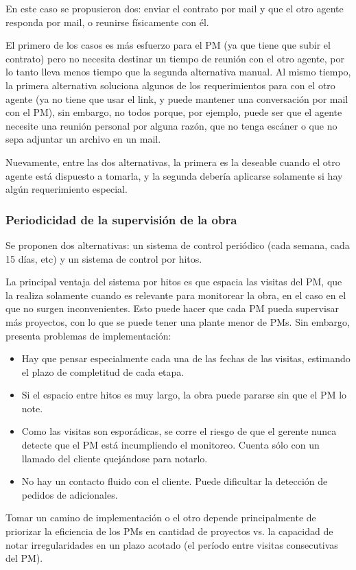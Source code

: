 En este caso se propusieron dos: enviar el contrato por mail y que el otro agente responda por mail, o reunirse físicamente con él.

El primero de los casos es más esfuerzo para el PM (ya que tiene que subir el contrato) pero no necesita destinar un tiempo de reunión con el otro agente, por lo tanto lleva menos tiempo que la segunda alternativa manual.
Al mismo tiempo, la primera alternativa soluciona algunos de los requerimientos para con el otro agente (ya no tiene que usar el link, y puede mantener una conversación por mail con el PM), sin embargo, no todos porque, por ejemplo, puede ser que el agente necesite una reunión personal por alguna razón, que no tenga escáner o que no sepa adjuntar un archivo en un mail.

Nuevamente, entre las dos alternativas, la primera es la deseable cuando el otro agente está dispuesto a tomarla, y la segunda debería aplicarse solamente si hay algún requerimiento especial.

\subsubsection{Periodicidad de la supervisión de la obra}
Se proponen dos alternativas: un sistema de control periódico (cada semana, cada 15 días, etc) y un sistema de control por hitos.

La principal ventaja del sistema por hitos es que espacia las visitas del PM, que la realiza solamente cuando es relevante para monitorear la obra, en el caso en el que no surgen inconvenientes. Esto puede hacer que cada PM pueda supervisar más proyectos, con lo que se puede tener una plante menor de PMs. Sin embargo, presenta problemas de implementación:
\begin{itemize}
	\item Hay que pensar especialmente cada una de las fechas de las visitas, estimando el plazo de completitud de cada etapa.
	\item Si el espacio entre hitos es muy largo, la obra puede pararse sin que el PM lo note.
	\item Como las visitas son esporádicas, se corre el riesgo de que el gerente nunca detecte que el PM está incumpliendo el monitoreo. Cuenta sólo con un llamado del cliente quejándose para notarlo.
	\item No hay un contacto fluido con el cliente. Puede dificultar la detección de pedidos de adicionales.
\end{itemize}

Tomar un camino de implementación o el otro depende principalmente de priorizar la eficiencia de los PMs en cantidad de proyectos vs. la capacidad de notar irregularidades en un plazo acotado (el período entre visitas consecutivas del PM).
